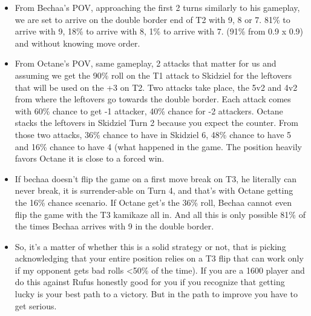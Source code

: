 \begin{itemize}
    \item From Bechaa's POV, approaching the first 2 turns similarly to his gameplay, we are set to arrive on the double border end of T2 with 9, 8 or 7. 81\% to arrive with 9, 18\% to arrive with 8, 1\% to arrive with 7. (91\% from 0.9 x 0.9) and without knowing move order.
    \item From Octane's POV, same gameplay, 2 attacks that matter for us and assuming we get the 90\% roll on the T1 attack to Skidziel for the leftovers that will be used on the +3 on T2. Two attacks take place, the 5v2 and 4v2 from where the leftovers go towards the double border. Each attack comes with 60\% chance to get -1 attacker, 40\% chance for -2 attackers. Octane stacks the leftovers in Skidziel Turn 2 because you expect the counter. From those two attacks, 36\% chance to have in Skidziel 6, 48\% chance to have 5 and 16\% chance to have 4 (what happened in the game. The position heavily favors Octane it is close to a forced win.
    \item If bechaa doesn't flip the game on a first move break on T3, he literally can never break, it is surrender-able on Turn 4, and that's with Octane getting the 16\% chance scenario. If Octane get's the 36\% roll, Bechaa cannot even flip the game with the T3 kamikaze all in. And all this is only possible 81\% of the times Bechaa arrives with 9 in the double border. 
    \item So, it's a matter of whether this is a solid strategy or not, that is picking acknowledging that your entire position relies on a T3 flip that can work only if my opponent gets bad rolls <50\% of the time). If you are a 1600 player and do this against Rufus honestly good for you if you recognize that getting lucky is your best path to a victory. But in the path to improve you have to get serious.
\end{itemize}

